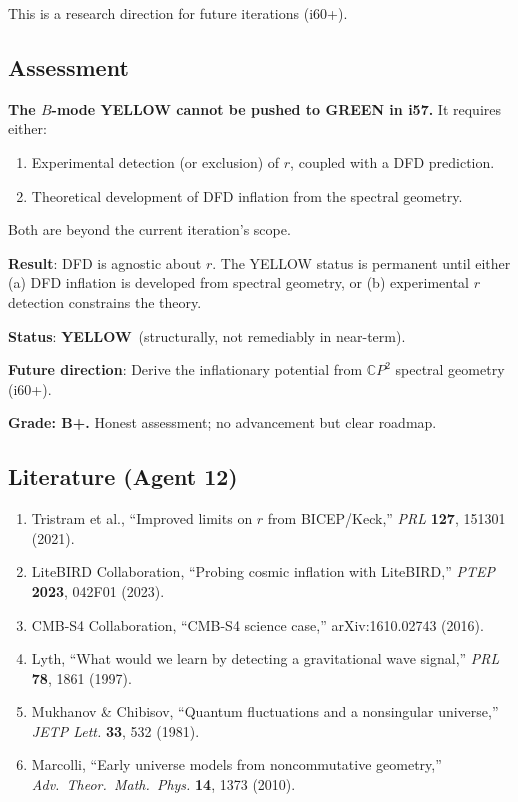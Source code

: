 \documentclass[11pt,a4paper]{article}
\newcommand{\YELLOW}{\textcolor{dfdyellow}{\textbf{YELLOW}}}
\newcommand{\CP}{\mathbb{C}P}
\begin{document}
This is a research direction for future iterations (i60+).

\subsection{Assessment}

\textbf{The $B$-mode YELLOW cannot be pushed to GREEN in i57.} It requires either:
\begin{enumerate}
\item Experimental detection (or exclusion) of $r$, coupled with a DFD prediction.
\item Theoretical development of DFD inflation from the spectral geometry.
\end{enumerate}

Both are beyond the current iteration's scope.

\begin{tcolorbox}[colback=yellow!5!white, colframe=yellow!60!black, title={Agent 12: $B$-mode --- Stable YELLOW}]
\textbf{Result}: DFD is agnostic about $r$. The YELLOW status is permanent until either (a) DFD inflation is developed from spectral geometry, or (b) experimental $r$ detection constrains the theory.

\textbf{Status}: \YELLOW\ (structurally, not remediably in near-term).

\textbf{Future direction}: Derive the inflationary potential from $\CP^2$ spectral geometry (i60+).

\textbf{Grade: B+.} Honest assessment; no advancement but clear roadmap.
\end{tcolorbox}

\subsection{Literature (Agent 12)}

\begin{enumerate}
\item Tristram et al., ``Improved limits on $r$ from BICEP/Keck,'' \textit{PRL} \textbf{127}, 151301 (2021).
\item LiteBIRD Collaboration, ``Probing cosmic inflation with LiteBIRD,'' \textit{PTEP} \textbf{2023}, 042F01 (2023).
\item CMB-S4 Collaboration, ``CMB-S4 science case,'' arXiv:1610.02743 (2016).
\item Lyth, ``What would we learn by detecting a gravitational wave signal,'' \textit{PRL} \textbf{78}, 1861 (1997).
\item Mukhanov \& Chibisov, ``Quantum fluctuations and a nonsingular universe,'' \textit{JETP Lett.} \textbf{33}, 532 (1981).
\item Marcolli, ``Early universe models from noncommutative geometry,'' \textit{Adv.\ Theor.\ Math.\ Phys.} \textbf{14}, 1373 (2010).
\end{enumerate}
\end{document}
